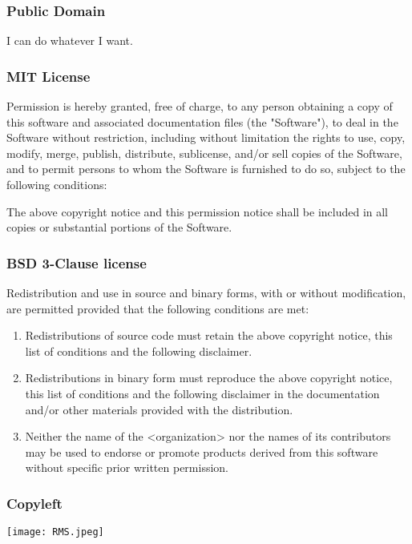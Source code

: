 \begin{frame}[fragile]
\frametitle{Public Domain}

I can do whatever I want.

\end{frame}

\begin{frame}[fragile]
\frametitle{MIT License}

Permission is hereby granted, free of charge, to any person
obtaining a copy of this software and associated documentation
files (the "Software"), to deal in the Software without
restriction, \alert{including without limitation the rights to use,
copy, modify, merge, publish, distribute, sublicense, and/or sell
copies of the Software}, and to permit persons to whom the
Software is furnished to do so, subject to the following
conditions:

The above copyright notice and this permission notice shall be
included in all copies or substantial portions of the Software.
\end{frame}

\begin{frame}[fragile]
\frametitle{BSD 3-Clause license}

Redistribution and use in source and binary forms, with or without
modification, are permitted provided that the following conditions are met:
\begin{enumerate}
\item Redistributions of source code must retain the above copyright notice, this list of conditions and the following disclaimer.
\item Redistributions in binary form must reproduce the above copyright notice, this list of conditions and the following disclaimer in the documentation and/or other materials provided with the distribution.
\item Neither the name of the <organization> nor the names of its contributors may be used to endorse or promote products derived from this software without specific prior written permission.
\end{enumerate}

\end{frame}

\begin{frame}[fragile]
\frametitle{Copyleft}

\centering
\texttt{[image: RMS.jpeg]}

\end{frame}

